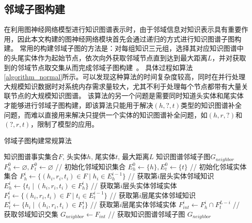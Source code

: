 \documentclass[algorithmlist, AutoFakeBold, AutoFakeSlant, figurelist, tablelist, nomlist, engineering]{seuthesix}
\begin{document}
\subsection{邻域子图构建}
在利用图神经网络模型进行知识图谱表示时，由于邻域信息对知识表示具有重要作用，因此本文构建的图神经网络模块首先会通过递归的方式进行知识图谱子图构建。
常用的构建邻域子图的方法是：对每组知识三元组，选择其对应知识图谱中的头尾实体作为起始节点，依次向外获取邻域节点直到达到最大距离$L$，并对获取到的邻域节点取交集从而完成邻域子图构建~\cite{teru2020inductive}。
具体过程如算法\ref{algorithm_normal}所示。可以发现这种算法的时间复杂度较高，同时在并行处理大规模知识数据时对系统内存需求量较大，尤其不利于处理每个节点都带有大量关联节点的大规模知识图谱。
该算法的另一个问题是需要同时知道头实体和尾实体才能够进行邻域子图构建，即该算法只能用于解决$(h, ?, t)$类型的知识图谱补全问题，而难以直接用来解决只提供一个实体的知识图谱补全问题，如$(h, r, ?)$和$(?, r, t)$，限制了模型的应用。
\begin{algorithm}[tb]
	\caption{邻域子图构建常规算法}  
	\label{algorithm_normal}
	\begin{algorithmic}[1]
  \Require 知识图谱事实集合$F$, 头实体$h$, 尾实体$t$, 最大距离$L$
  \Ensure 知识图谱邻域子图$G_{neighbor}$
  \State $F_{h}^{0} \leftarrow \varnothing, F_{t}^{0} \leftarrow \varnothing$ // 初始化邻域知识集合
  \State $E_{h}^{0} \leftarrow \{h\}, E_{t}^{0} \leftarrow \{t\}$ // 初始化邻域实体集合
  \State $F_{h}^{i} \leftarrow \{(h_i, r_i, t_i) \in F \mid h_i \in E_{h}^{i-1}\}$ // 获取第$i$层头实体邻域知识
  \State $E_{h}^{i} \leftarrow \{t_i \mid (h_i, r_i, t_i) \in F_{h}^{i}\}$ // 获取第$i$层头实体邻域实体
  \State $F_{t}^{i} \leftarrow \{(h_i, r_i, t_i) \in F \mid t_i \in E_{t}^{i-1}\}$ // 获取第$i$层尾实体邻域知识
  \State $E_{t}^{i} \leftarrow \{h_i \mid (h_i, r_i, t_i) \in F_{t}^{i}\}$ // 获取第$i$层尾实体邻域实体
  \EndFor
  \State $F_{int}^{i} \leftarrow F_{h}^{i} \cap F_{t}^{L-i}$ // 获取邻域知识交集
  \EndFor
  \State $G_{neighbor} \leftarrow F_{int}$ // 获取知识图谱邻域子图
  \State \Return $G_{neighbor}$
	\end{algorithmic}
\end{algorithm} 
\end{document}
